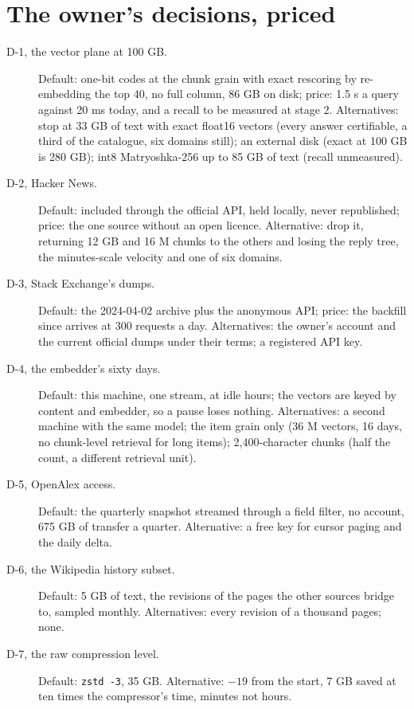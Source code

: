 \documentclass[11pt]{article}
\theoremstyle{plain}
\theoremstyle{definition}
\theoremstyle{remark}
\newcommand{\code}[1]{\texttt{#1}}
\begin{document}
\section{The owner's decisions, priced}
\begin{description}
  \item[D-1, the vector plane at 100 GB.] Default: one-bit codes at the chunk grain with exact
    rescoring by re-embedding the top 40, no full column, 86 GB on disk; price: 1.5 s a query
    against 20 ms today, and a recall to be measured at stage 2. Alternatives: stop at 33 GB of
    text with exact float16 vectors (every answer certifiable, a third of the catalogue, six domains
    still); an external disk (exact at 100 GB is 280 GB); int8 Matryoshka-256 up to 85 GB of text
    (recall unmeasured).
  \item[D-2, Hacker News.] Default: included through the official API, held locally, never
    republished; price: the one source without an open licence. Alternative: drop it, returning
    12 GB and 16 M chunks to the others and losing the reply tree, the minutes-scale velocity and
    one of six domains.
  \item[D-3, Stack Exchange's dumps.] Default: the 2024-04-02 archive plus the anonymous API;
    price: the backfill since arrives at 300 requests a day. Alternatives: the owner's account and
    the current official dumps under their terms; a registered API key.
  \item[D-4, the embedder's sixty days.] Default: this machine, one stream, at idle hours; the
    vectors are keyed by content and embedder, so a pause loses nothing. Alternatives: a second
    machine with the same model; the item grain only (36 M vectors, 16 days, no chunk-level
    retrieval for long items); 2,400-character chunks (half the count, a different retrieval unit).
  \item[D-5, OpenAlex access.] Default: the quarterly snapshot streamed through a field filter, no
    account, 675 GB of transfer a quarter. Alternative: a free key for cursor paging and the daily
    delta.
  \item[D-6, the Wikipedia history subset.] Default: 5 GB of text, the revisions of the pages the
    other sources bridge to, sampled monthly. Alternatives: every revision of a thousand pages;
    none.
  \item[D-7, the raw compression level.] Default: \code{zstd -3}, 35 GB. Alternative: $-19$ from
    the start, 7 GB saved at ten times the compressor's time, minutes not hours.
\end{description}
\end{document}
